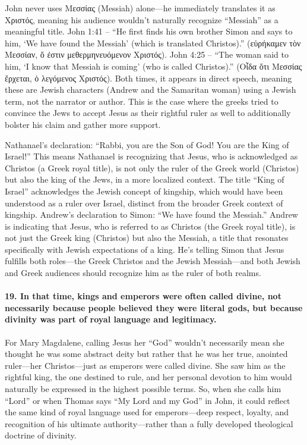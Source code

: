 John never uses Μεσσίας (Messiah) alone---he immediately translates it as Χριστός, meaning his audience wouldn't naturally recognize ``Messiah'' as a meaningful title.
John 1:41 -- ``He first finds his own brother Simon and says to him, `We have found the Messiah' (which is translated Christos).'' (εὑρήκαμεν τὸν Μεσσίαν, ὅ ἐστιν μεθερμηνευόμενον Χριστός).
John 4:25 -- ``The woman said to him, `I know that Messiah is coming' (who is called Christos).'' (Οἶδα ὅτι Μεσσίας ἔρχεται, ὁ λεγόμενος Χριστός).
Both times, it appears in direct speech, meaning these are Jewish characters (Andrew and the Samaritan woman) using a Jewish term, not the narrator or author.
This is the case where the greeks tried to convince the Jews to accept Jesus as their rightful ruler as well to additionally bolster his claim and gather more support.

Nathanael's declaration: ``Rabbi, you are the Son of God!
You are the King of Israel!'' This means Nathanael is recognizing that Jesus, who is acknowledged as Christos (a Greek royal title), is not only the ruler of the Greek world (Christos) but also the king of the Jews, in a more localized context.
The title ``King of Israel'' acknowledges the Jewish concept of kingship, which would have been understood as a ruler over Israel, distinct from the broader Greek context of kingship.
Andrew's declaration to Simon: ``We have found the Messiah.'' Andrew is indicating that Jesus, who is referred to as Christos (the Greek royal title), is not just the Greek king (Christos) but also the Messiah, a title that resonates specifically with Jewish expectations of a king.
He's telling Simon that Jesus fulfills both roles---the Greek Christos and the Jewish Messiah---and both Jewish and Greek audiences should recognize him as the ruler of both realms.

\paragraph{19.
In that time, kings and emperors were often called divine, not necessarily because people believed they were literal gods, but because divinity was part of royal language and legitimacy.}\label{par:in-that-time-kings-and-emperors-were-often-called-divine-not-necessarily-because-people-believed-they-were-literal-gods-but-because-divinity-was-part-of-royal-language-and-legitimacy.}

For Mary Magdalene, calling Jesus her ``God'' wouldn't necessarily mean she thought he was some abstract deity but rather that he was her true, anointed ruler---her Christos---just as emperors were called divine.
She saw him as the rightful king, the one destined to rule, and her personal devotion to him would naturally be expressed in the highest possible terms.
So, when she calls him ``Lord'' or when Thomas says ``My Lord and my God'' in John, it could reflect the same kind of royal language used for emperors---deep respect, loyalty, and recognition of his ultimate authority---rather than a fully developed theological doctrine of divinity.

